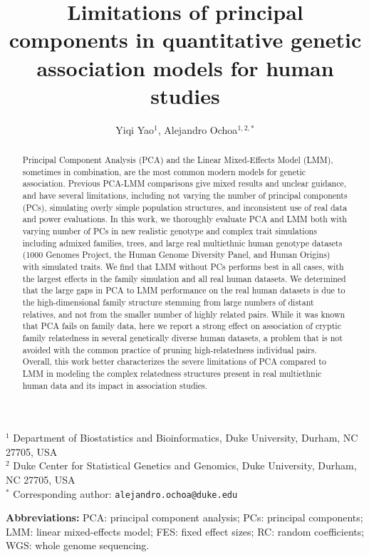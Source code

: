 \documentclass[11pt]{article}
\title{\Large \textbf{
    Limitations of principal components in quantitative genetic association models for human studies
  }}
\author{Yiqi Yao$^1$, Alejandro Ochoa$^{1,2,*}$}
\date{}
\begin{document}
\maketitle

\noindent
$^1$ Department of Biostatistics and Bioinformatics, Duke University, Durham, NC 27705, USA \\
$^2$ Duke Center for Statistical Genetics and Genomics, Duke University, Durham, NC 27705, USA \\
$^*$ Corresponding author: \texttt{alejandro.ochoa@duke.edu}

\begin{abstract}
  Principal Component Analysis (PCA) and the Linear Mixed-Effects Model (LMM), sometimes in combination, are the most common modern models for genetic association.
  Previous PCA-LMM comparisons give mixed results and unclear guidance, and have several limitations, including not varying the number of principal components (PCs), simulating overly simple population structures, and inconsistent use of real data and power evaluations.
  In this work, we thoroughly evaluate PCA and LMM both with varying number of PCs in new realistic genotype and complex trait simulations including admixed families, trees, and large real multiethnic human genotype datasets (1000 Genomes Project, the Human Genome Diversity Panel, and Human Origins) with simulated traits.
  We find that LMM without PCs performs best in all cases, with the largest effects in the family simulation and all real human datasets.
  We determined that the large gaps in PCA to LMM performance on the real human datasets is due to the high-dimensional family structure stemming from large numbers of distant relatives, and not from the smaller number of highly related pairs.
  While it was known that PCA fails on family data, here we report a strong effect on association of cryptic family relatedness in several genetically diverse human datasets, a problem that is not avoided with the common practice of pruning high-relatedness individual pairs.
  Overall, this work better characterizes the severe limitations of PCA compared to LMM in modeling the complex relatedness structures present in real multiethnic human data and its impact in association studies.
\end{abstract}


\textbf{Abbreviations:}
PCA: principal component analysis;
PCs: principal components;
LMM: linear mixed-effects model;
FES: fixed effect sizes;
RC: random coefficients;
WGS: whole genome sequencing.
\end{document}
